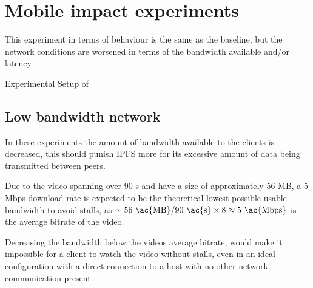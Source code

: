 


\FloatBarrier \section{Mobile impact experiments}
\label{sec:eval_mobile}
This experiment in terms of behaviour is the same as the baseline, but the network conditions are worsened  in terms of the bandwidth available and/or latency.

\begin{table}[!htbp]
    \myfloatalign
    \caption[Experimental Setup of Mobile]{Experimental Setup of }
    \label{tab:exp_overview_mobile}
    
\end{table}

\subsection{Low bandwidth network}
\label{sec:eval_low_bandwidth}
In these experiments the amount of bandwidth available to the clients is decreased, this should punish \ac{IPFS} more for its excessive amount of data being transmitted between peers.

Due to the video spanning over 90 \ac{s} and have a size of approximately 56 \ac{MB}, a 5 \ac{Mbps} download rate is expected to be the theoretical lowest possible usable bandwidth to avoid stalls, as $\sim56 \text{ \ac{MB}} / 90 \text{ \ac{s}} \times 8 \approx 5 \text{ \ac{Mbps}}$ is the average bitrate of the video.

Decreasing the bandwidth below the videos average bitrate, would make it impossible for a client to watch the video without stalls, even in an ideal configuration with a direct connection to a host with no other network communication present.

